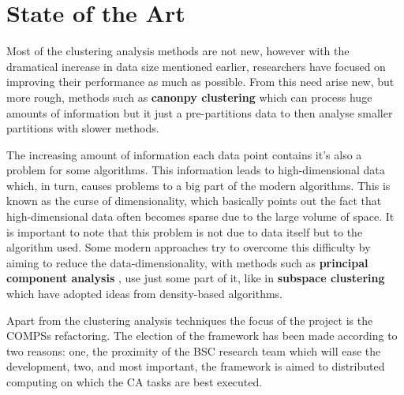 \section{State of the Art}


Most of the clustering analysis methods are not new, however with the dramatical increase in data size mentioned earlier, researchers have focused on improving their performance as much as possible. From this need arise new, but more rough, methods such as \textbf{canonpy clustering} \cite{Nayak2015} which can process huge amounts of information but it just a pre-partitions data to then analyse smaller partitions with slower methods.

The increasing amount of information each data point contains it's also a problem for some algorithms. This information leads to high-dimensional data which, in turn, causes problems to a big part of the modern algorithms. This is known as the curse of dimensionality, which basically points out the fact that high-dimensional data often becomes sparse due to the large volume of space. It is important to note that this problem is not due to data itself but to the algorithm used. Some modern approaches try to overcome this difficulty by aiming to reduce the data-dimensionality, with  methods such as \textbf{principal component analysis} \cite{Kupski2015}, use just some part of it, like in \textbf{subspace clustering} \cite{Adler2015} which have adopted ideas from density-based algorithms.

Apart from the clustering analysis techniques the focus of the project is the COMPSs refactoring. The election of the framework has been made according to two reasons: one, the proximity of the BSC research team which will ease the development, two, and most important, the framework is aimed to distributed computing on which the CA tasks are best executed. 

